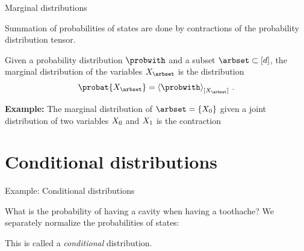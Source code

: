 \documentclass{beamer}
\begin{document}
    \begin{frame}{Marginal distributions}

        Summation of probabilities of states are done by contractions of the probability distribution tensor.

        \begin{definition}
        Given a probability distribution $\probwith$ and a subset $\arbset\subset[\catorder]$, the marginal distribution of the variables $\catvariableof{\arbset}$ is the distribution
        \begin{align*}
            \probat{\catvariableof{\arbset}}
            = \contractionof{\probwith}{\catvariableof{\arbset}} \, .
        \end{align*}
        \end{definition}

            {\bf Example:} The marginal distribution of $\arbset=\{\catvariableof{0}\}$ given a joint distribution of two variables $X_{0}$ and $X_{1}$ is the contraction
        \begin{center}
            
        \end{center}

    \end{frame}



    \section{Conditional distributions}


    \begin{frame}{Example: Conditional distributions}

        What is the probability of having a cavity when having a toothache?
        We separately normalize the probabilities of states:

        

        \medskip

        This is called a \emph{conditional} distribution.


    \end{frame}
\end{document}
